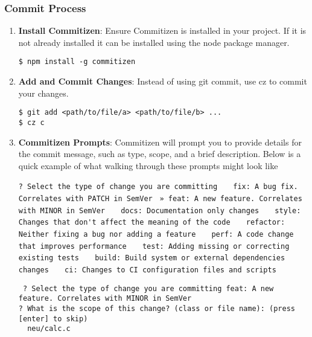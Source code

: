 \documentclass{ol-softwaremanual}
\begin{document}
\subsubsection{Commit Process}
\begin{enumerate}
\item \textbf{Install Commitizen}: Ensure Commitizen is installed in your project. If it is not already installed it can be installed using the node package manager. 
\begin{terminal}
\begin{verbatim}
$ npm install -g commitizen
\end{verbatim}
\end{terminal}
\item \textbf{Add and Commit Changes}: Instead of using git commit, use cz to commit your changes.
\begin{terminal}
\begin{verbatim}
$ git add <path/to/file/a> <path/to/file/b> ...
$ cz c
\end{verbatim}
\end{terminal}
\item \textbf{Commitizen Prompts}: Commitizen will prompt you to provide details for the commit message, such as type, scope, and a brief description. Below is a quick example of what walking through these prompts might look like
\begin{terminal}
\Verb#? Select the type of change you are committing#
\Verb#   fix: A bug fix. Correlates with PATCH in SemVer#
{\color{orange}\Verb# » feat: A new feature. Correlates with MINOR in SemVer#}
\Verb#   docs: Documentation only changes#
\Verb#   style: Changes that don't affect the meaning of the code#
\Verb#   refactor: Neither fixing a bug nor adding a feature#
\Verb#   perf: A code change that improves performance#
\Verb#   test: Adding missing or correcting existing tests#
\Verb#   build: Build system or external dependencies changes#
\Verb#   ci: Changes to CI configuration files and scripts#
\end{terminal}
\begin{terminal}
\texttt{{\color{orange} ?} Select the type of change you are committing {\color{orange}feat: A new feature. Correlates with MINOR in SemVer}}\\
\texttt{{\color{orange}?} What is the scope of this change? (class or file name): (press [enter] to skip)}\\
\texttt{\color{orange} \ neu/calc.c}
\end{terminal}
\begin{terminal}

\end{terminal}
\end{enumerate}
\end{document}
